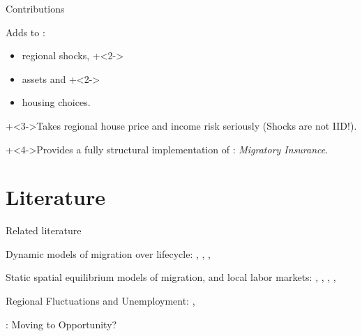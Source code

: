 \documentclass[12pt,english, aspectratio=169]{beamer}
\begin{document}
\begin{frame}{Contributions}

\begin{widee}
\item Adds to \cite{kennan2003effect}: 

\begin{itemize}
\onslide+<2->\item regional shocks,
\onslide+<2->\item assets and 
\onslide+<2->\item housing choices.
\end{itemize} 
\item \onslide+<3->Takes regional house price and income risk seriously (Shocks are not IID!).
\item \onslide+<4->Provides a fully structural implementation of \cite{yagan,yagan2017employment}: \emph{Migratory Insurance}. 
\end{widee}
\end{frame}



\section{Literature}
\begin{frame}{Related literature}

\begin{widei}
\item Dynamic models of migration over lifecycle: {\footnotesize{}\cite{baum2012understanding}, \cite{kennan2003effect}, \cite{gemici2007family}, \cite{ransom2018labor}\vspace{3mm}}
\item Static spatial equilibrium models of migration, and local labor markets:
{\footnotesize{}\cite{notowidigdo2011incidence}, \cite{Moretti:2011fk}, \cite{diamond2016determinants},
\cite{piypromdee}, \cite{monras2018economic}\vspace{3mm}}
\item Regional Fluctuations and Unemployment: {\footnotesize{}\cite{blanchard1992regional}, \cite{schmutz}}
\item  \cite{yagan,yagan2017employment}: Moving to Opportunity?
\end{widei}
\end{frame}
\end{document}
